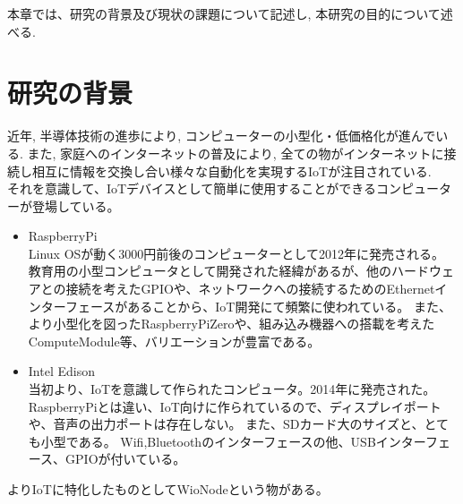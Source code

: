 本章では、研究の背景及び現状の課題について記述し, 本研究の目的について述べる.

\section{研究の背景}
近年, 半導体技術の進歩により, コンピューターの小型化・低価格化が進んでいる. 
また, 家庭へのインターネットの普及により, 全ての物がインターネットに接続し相互に情報を交換し合い様々な自動化を実現するIoTが注目されている.\\

それを意識して、IoTデバイスとして簡単に使用することができるコンピューターが登場している。
\begin{itemize}
\item RaspberryPi\\
	Linux OSが動く3000円前後のコンピューターとして2012年に発売される。
	教育用の小型コンピュータとして開発された経緯があるが、他のハードウェアとの接続を考えたGPIOや、ネットワークへの接続するためのEthernetインターフェースがあることから、IoT開発にて頻繁に使われている。
	また、より小型化を図ったRaspberryPiZeroや、組み込み機器への搭載を考えたComputeModule等、バリエーションが豊富である。
\item Intel Edison\\
	当初より、IoTを意識して作られたコンピュータ。2014年に発売された。
	RaspberryPiとは違い、IoT向けに作られているので、ディスプレイポートや、音声の出力ポートは存在しない。
	また、SDカード大のサイズと、とても小型である。
	Wifi,Bluetoothのインターフェースの他、USBインターフェース、GPIOが付いている。
\end{itemize}
よりIoTに特化したものとしてWioNodeという物がある。


\begin{comment}
RaspberryPiについて
Linuxが動く3000円のコンピューターとして2012年に発売される。
以降、価格を抑えながら性能の向上を図ってきた。
raspberrypi Zeroの発表->さらなる低価格かつ小型になる
RaspbianというDebianベースのディストリビューションが動く

Intel Edison
IoTを意識した製品。RaspberryPiに比べると、値段は高いが、とても小型。Wifi,Bluetoothが搭載されている。
RaspberryPiにあったHDMI端子等画面出力用端子やオーディオ出力用端子等は用意されていない。
また、USBも1口しか無い。yocto Linux　や ubiLinux　といったLinuxディストリビューションが動く

最近ではWioNodeという物も出てきている。
ESP-WROOM-02 の登場
Ardiuno
beaglebone
\end{comment}

